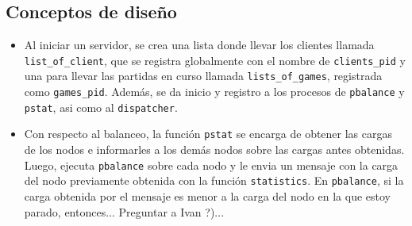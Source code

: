 \documentclass[a4paper]{article}
\newcommand{\blacktr}[0]{\item[$\blacktriangleright$]}
\begin{document}
\subsection*{Conceptos de diseño}
\begin{itemize}
  \blacktr Al iniciar un servidor, se crea una lista donde llevar los clientes llamada \texttt{list_of_client}, que se registra globalmente con el nombre de \texttt{clients_pid} y una para llevar las partidas en curso llamada \texttt{lists_of_games}, registrada como \texttt{games_pid}. Además, se da inicio y registro a los procesos de \texttt{pbalance} y \texttt{pstat}, asi como al \texttt{dispatcher}.
  \blacktr Con respecto al balanceo, la función \texttt{pstat} se encarga de obtener las cargas de los nodos e informarles a los demás nodos sobre las cargas antes obtenidas. Luego, ejecuta \texttt{pbalance} sobre cada nodo y le envia un mensaje con la carga del nodo previamente obtenida con la función \texttt{statistics}. En \texttt{pbalance}, si la carga obtenida por el mensaje es menor a la carga del nodo en la que estoy parado, entonces... Preguntar a Ivan ?)...
  

\end{itemize}
\end{document}
